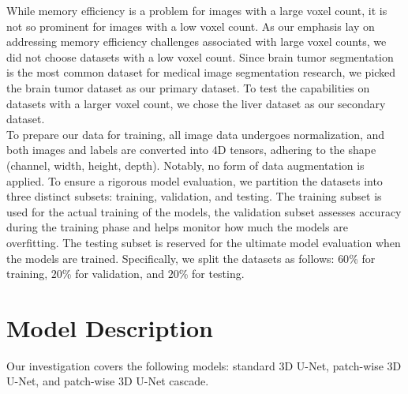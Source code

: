 \noindent While memory efficiency is a problem for images with a large voxel count, it is not so prominent for images with a low voxel count.
As our emphasis lay on addressing memory efficiency challenges associated with large voxel counts, we did not choose datasets with a low voxel count.
Since brain tumor segmentation is the most common dataset for medical image segmentation research, we picked the brain tumor dataset as our primary dataset.
To test the capabilities on datasets with a larger voxel count, we chose the liver dataset as our secondary dataset.\\[1ex]
\noindent To prepare our data for training, all image data undergoes normalization, and both images and labels are converted into $4$D tensors, adhering to the shape (channel, width, height, depth).
Notably, no form of data augmentation is applied. To ensure a rigorous model evaluation, we partition the datasets into three distinct subsets: training, validation, and testing.
The training subset is used for the actual training of the models, the validation subset assesses accuracy during the training phase and helps monitor how much the models are overfitting.
The testing subset is reserved for the ultimate model evaluation when the models are trained.
Specifically, we split the datasets  as follows: $60$\% for training, $20$\% for validation, and $20$\% for testing.

\section{Model Description}
Our investigation covers the following models: standard $3$D U-Net, patch-wise $3$D U-Net, and patch-wise $3$D U-Net cascade.

